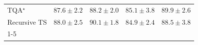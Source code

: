 \begin{tabular}{l|cccc|}
TQA$^\star$ & {\cellcolor[HTML]{046299}} \color[HTML]{F1F1F1} $87.6\pm 2.2$ & {\cellcolor[HTML]{045D92}} \color[HTML]{F1F1F1} $88.2\pm 2.0$ & {\cellcolor[HTML]{0F76B3}} \color[HTML]{F1F1F1} $85.1\pm 3.8$ & {\cellcolor[HTML]{034B76}} \color[HTML]{F1F1F1} $89.9\pm 2.6$ \\
Recursive TS & {\cellcolor[HTML]{045F95}} \color[HTML]{F1F1F1} $88.0\pm 2.5$ & {\cellcolor[HTML]{034973}} \color[HTML]{F1F1F1} $90.1\pm 1.8$ & {\cellcolor[HTML]{1278B4}} \color[HTML]{F1F1F1} $84.9\pm 2.4$ & {\cellcolor[HTML]{045B8E}} \color[HTML]{F1F1F1} $88.5\pm 3.8$ \\
\cline{1-5}
\bottomrule
\end{tabular}
